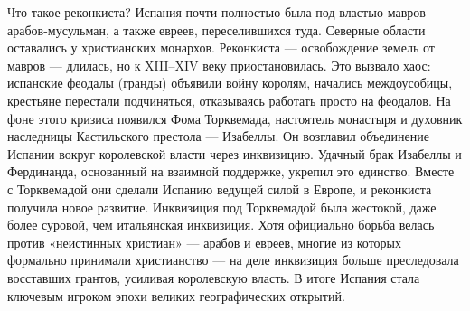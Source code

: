 
Что такое реконкиста? Испания почти полностью была под властью мавров --- арабов-мусульман, а также евреев, переселившихся туда. Северные области оставались у христианских монархов. Реконкиста --- освобождение земель от мавров --- длилась, но к XIII–XIV веку приостановилась. Это вызвало хаос: испанские феодалы (гранды) объявили войну королям, начались междоусобицы, крестьяне перестали подчиняться, отказываясь работать просто на феодалов.
На фоне этого кризиса появился Фома Торквемада, настоятель монастыря и духовник наследницы Кастильского престола --- Изабеллы. Он возглавил объединение Испании вокруг королевской власти через инквизицию. Удачный брак Изабеллы и Фердинанда, основанный на взаимной поддержке, укрепил это единство. Вместе с Торквемадой они сделали Испанию ведущей силой в Европе, и реконкиста получила новое развитие. Инквизиция под Торквемадой была жестокой, даже более суровой, чем итальянская инквизиция. Хотя официально борьба велась против «неистинных христиан» --- арабов и евреев, многие из которых формально принимали христианство --- на деле инквизиция больше преследовала восставших грантов, усиливая королевскую власть. В итоге Испания стала ключевым игроком эпохи великих географических открытий.

